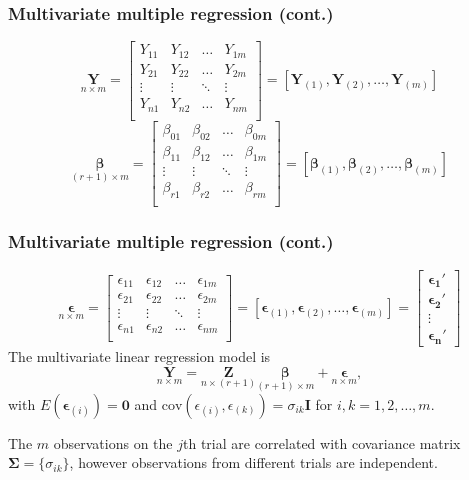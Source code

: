 \documentclass{beamer}
\begin{document}
	\begin{frame}
		\frametitle{Multivariate multiple regression (cont.)}
		\[ \underset{ n \times m }{ \pmb{ Y } } = \begin{bmatrix}
			Y_{ 11 } & Y_{ 12 } & \dots & Y_{ 1m } \\
			Y_{ 21 } & Y_{ 22 } & \dots & Y_{ 2m } \\
			\vdots   & \vdots  & \ddots & \vdots \\
			Y_{ n1 } & Y_{ n2} & \dots & Y_{ nm } \\
		\end{bmatrix} = [ \pmb{Y}_{ ( 1 ) }, \pmb{Y}_{ ( 2 ) }, \dots, \pmb{Y}_{ ( m ) } ]\]
		\[ \underset{ ( r + 1 ) \times m }{ \pmb{ \beta } } = \begin{bmatrix}
			\beta_{ 01 } & \beta_{ 02 } & \dots & \beta_{ 0m } \\
			\beta_{ 11 } & \beta_{ 12 } & \dots & \beta_{ 1m } \\
			\vdots   & \vdots  & \ddots & \vdots \\
			\beta_{ r1 } & \beta_{ r2 } & \dots & \beta_{ rm } \\
		\end{bmatrix} = [ \pmb{ \beta }_{ ( 1 ) }, \pmb{ \beta }_{ ( 2 ) }, \dots, \pmb{ \beta }_{ ( m ) } ] \]
	\end{frame}
	
	\begin{frame}
		\frametitle{Multivariate multiple regression (cont.)}
		\[ \underset{ n \times m }{ \pmb{ \epsilon } } = \begin{bmatrix}
			\epsilon_{ 11 } & \epsilon_{ 12 } & \dots & \epsilon_{ 1m } \\
			\epsilon_{ 21 } & \epsilon_{ 22 } & \dots & \epsilon_{ 2m } \\
			\vdots   & \vdots  & \ddots & \vdots \\
			\epsilon_{ n1 } & \epsilon_{ n2} & \dots & \epsilon_{ nm } \\
		\end{bmatrix} = [ \pmb{\epsilon}_{ ( 1 ) }, \pmb{\epsilon}_{ ( 2 ) }, \dots, \pmb{\epsilon}_{ ( m ) } ] = \begin{bmatrix}
		\pmb{ \epsilon_1'} \\
		\pmb{ \epsilon_2'} \\
		\vdots \\
		\pmb{ \epsilon_n'}
	\end{bmatrix} \]
	The multivariate linear regression model is 
	\[ \underset{ n \times m }{ \pmb{ Y } } = \underset{ n \times ( r + 1 ) }{ \pmb{ Z } } \underset{ ( r + 1 ) \times m }{ \pmb{ \beta } } + \underset{ n \times m }{ \pmb{ \epsilon } }, \]
	with $E( \pmb{ \epsilon }_{ ( i ) } ) = \pmb{ 0 }$ and $\text{cov}( \epsilon_{ ( i ) }, \epsilon_{ ( k ) } ) = \sigma_{ ik } \pmb{ I }$ for $i, k = 1, 2, \dots, m$. 
	
	The $m$ observations on the $j$th trial are correlated with covariance matrix $\pmb{ \Sigma } = \{ \sigma_{ ik } \}$, however observations from different trials are independent.
	\end{frame}
	
\end{document}
